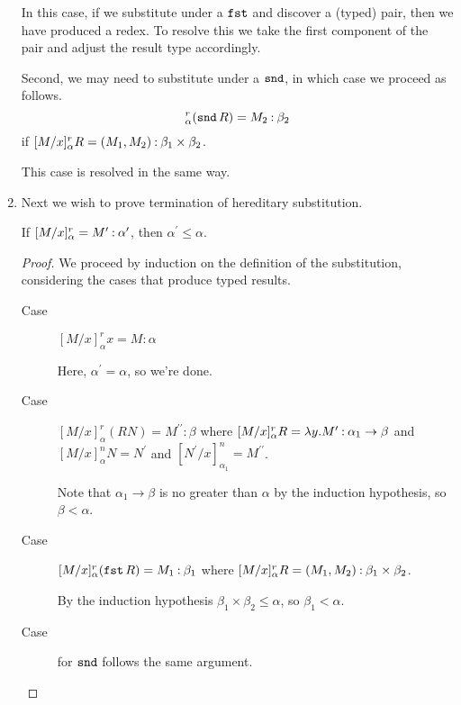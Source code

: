 \documentclass[11pt,letterpaper]{article}
\begin{document}
\begin{enumerate}
    In this case, if we substitute under a $\operatorname{\mathtt{fst}}$ and discover a (typed) pair,
    then we have produced a redex. To resolve this we take the first component
    of the pair and adjust the result type accordingly.

    Second, we may need to substitute under a $\operatorname{\mathtt{snd}}$, in which case we proceed
    as follows.
    \begin{equation*}
      [M/x]^r_\alpha (\snd R) = M_2 \hastype \beta_2
    \end{equation*}
    if $[M/x]^r_\alpha R = (M_1, M_2) \mathbin{:} \beta_1 \times \beta_2$.

    This case is resolved in the same way.

  \item
    Next we wish to prove termination of hereditary substitution.

    \begin{lem}
      If $[M/x]^r_\alpha = M^\prime \mathbin{:} \alpha^\prime$,
      then $\alpha^\prime \leq \alpha$.
    \end{lem}

    \begin{proof}
      We proceed by induction on the definition of the substitution,
      considering the cases that produce typed results.
      \begin{description}
        \item[Case]
          $[M/x]^r_\alpha x = M : \alpha$

          Here, $\alpha^\prime = \alpha$, so we're done.

        \item[Case]
          $[M/x]^r_\alpha (R N) = M^{\prime\prime} : \beta$
          where
          $[M/x]^r_\alpha R = \lambda y. M^\prime \mathbin{:} \alpha_1 \to \beta$
          and
          $[M/x]_\alpha^n N = N^\prime$
          and
          $[N^\prime/x]_{\alpha_1}^n = M^{\prime\prime}$.

          Note that $\alpha_1 \to \beta$ is no greater than $\alpha$ by the
          induction hypothesis, so $\beta < \alpha$.

        \item[Case]
          $[M/x]^r_\alpha (\operatorname{\mathtt{fst}} R) = M_1 \mathbin{:} \beta_1$
          where
          $[M/x]^r_\alpha R = (M_1, M_2) \mathbin{:} \beta_1 \times \beta_2$.

          By the induction hypothesis $\beta_1 \times \beta_2 \leq \alpha$,
          so $\beta_1 < \alpha$.

        \item[Case] for $\operatorname{\mathtt{snd}}$ follows the same argument.
      \end{description}
    \end{proof}


\end{enumerate}
\end{document}
